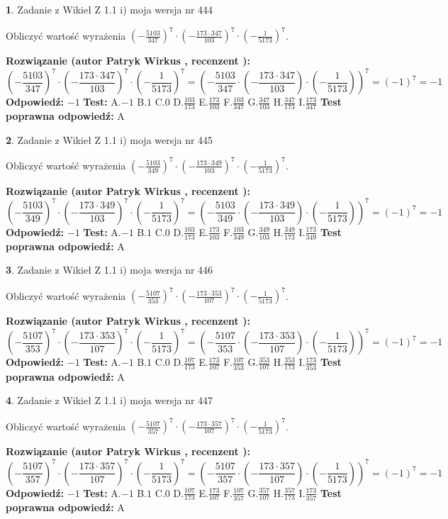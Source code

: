 \documentclass[12pt, a4paper]{article}
\theoremstyle{definition} %
\newtheorem{zad}{}
\newcommand{\zadStart}[1]{\begin{zad}#1\newline}
\newcommand{\zadStop}{\end{zad}}
\newcommand{\rozwStart}[2]{\noindent \textbf{Rozwiązanie (autor #1 , recenzent #2): }\newline}
\newcommand{\rozwStop}{\newline}
\newcommand{\odpStart}{\noindent \textbf{Odpowiedź:}\newline}
\newcommand{\odpStop}{\newline}
\newcommand{\testStart}{\noindent \textbf{Test:}\newline}
\newcommand{\testStop}{\newline}
\newcommand{\kluczStart}{\noindent \textbf{Test poprawna odpowiedź:}\newline}
\newcommand{\kluczStop}{\newline}
\begin{document}
\zadStart{Zadanie z Wikieł Z 1.1 i) moja wersja nr 444}

Obliczyć wartość wyrażenia $(-\frac{5103}{347})^{7} \cdot (-\frac{173 \cdot 347}{103})^{7} \cdot (-\frac{1}{5173})^{7}$.
\zadStop
\rozwStart{Patryk Wirkus}{}
$$(-\frac{5103}{347})^{7} \cdot (-\frac{173 \cdot 347}{103})^{7} \cdot (-\frac{1}{5173})^{7} = (-\frac{5103}{347} \cdot (-\frac{173 \cdot 347}{103}) \cdot (-\frac{1}{5173}))^{7} = (-1)^{7} = -1$$
\rozwStop
\odpStart
$-1$
\odpStop
\testStart
A.$-1$ B.$1$ C.$0$ D.$\frac{103}{173}$ E.$\frac{173}{103}$
F.$\frac{103}{347}$ G.$\frac{347}{103}$
H.$\frac{347}{173}$
I.$\frac{173}{347}$
\testStop
\kluczStart
A
\kluczStop



\zadStart{Zadanie z Wikieł Z 1.1 i) moja wersja nr 445}

Obliczyć wartość wyrażenia $(-\frac{5103}{349})^{7} \cdot (-\frac{173 \cdot 349}{103})^{7} \cdot (-\frac{1}{5173})^{7}$.
\zadStop
\rozwStart{Patryk Wirkus}{}
$$(-\frac{5103}{349})^{7} \cdot (-\frac{173 \cdot 349}{103})^{7} \cdot (-\frac{1}{5173})^{7} = (-\frac{5103}{349} \cdot (-\frac{173 \cdot 349}{103}) \cdot (-\frac{1}{5173}))^{7} = (-1)^{7} = -1$$
\rozwStop
\odpStart
$-1$
\odpStop
\testStart
A.$-1$ B.$1$ C.$0$ D.$\frac{103}{173}$ E.$\frac{173}{103}$
F.$\frac{103}{349}$ G.$\frac{349}{103}$
H.$\frac{349}{173}$
I.$\frac{173}{349}$
\testStop
\kluczStart
A
\kluczStop



\zadStart{Zadanie z Wikieł Z 1.1 i) moja wersja nr 446}

Obliczyć wartość wyrażenia $(-\frac{5107}{353})^{7} \cdot (-\frac{173 \cdot 353}{107})^{7} \cdot (-\frac{1}{5173})^{7}$.
\zadStop
\rozwStart{Patryk Wirkus}{}
$$(-\frac{5107}{353})^{7} \cdot (-\frac{173 \cdot 353}{107})^{7} \cdot (-\frac{1}{5173})^{7} = (-\frac{5107}{353} \cdot (-\frac{173 \cdot 353}{107}) \cdot (-\frac{1}{5173}))^{7} = (-1)^{7} = -1$$
\rozwStop
\odpStart
$-1$
\odpStop
\testStart
A.$-1$ B.$1$ C.$0$ D.$\frac{107}{173}$ E.$\frac{173}{107}$
F.$\frac{107}{353}$ G.$\frac{353}{107}$
H.$\frac{353}{173}$
I.$\frac{173}{353}$
\testStop
\kluczStart
A
\kluczStop



\zadStart{Zadanie z Wikieł Z 1.1 i) moja wersja nr 447}

Obliczyć wartość wyrażenia $(-\frac{5107}{357})^{7} \cdot (-\frac{173 \cdot 357}{107})^{7} \cdot (-\frac{1}{5173})^{7}$.
\zadStop
\rozwStart{Patryk Wirkus}{}
$$(-\frac{5107}{357})^{7} \cdot (-\frac{173 \cdot 357}{107})^{7} \cdot (-\frac{1}{5173})^{7} = (-\frac{5107}{357} \cdot (-\frac{173 \cdot 357}{107}) \cdot (-\frac{1}{5173}))^{7} = (-1)^{7} = -1$$
\rozwStop
\odpStart
$-1$
\odpStop
\testStart
A.$-1$ B.$1$ C.$0$ D.$\frac{107}{173}$ E.$\frac{173}{107}$
F.$\frac{107}{357}$ G.$\frac{357}{107}$
H.$\frac{357}{173}$
I.$\frac{173}{357}$
\testStop
\kluczStart
A
\kluczStop
\end{document}
